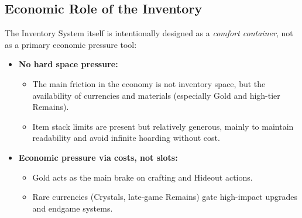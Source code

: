 \subsection{Economic Role of the Inventory}

The Inventory System itself is intentionally designed as a \emph{comfort container}, not as a primary economic pressure tool:

\begin{itemize}
	\item \textbf{No hard space pressure:}
	\begin{itemize}
		\item The main friction in the economy is not inventory space, but the availability of currencies and materials (especially Gold and high-tier Remains).
		\item Item stack limits are present but relatively generous, mainly to maintain readability and avoid infinite hoarding without cost.
	\end{itemize}
	\item \textbf{Economic pressure via costs, not slots:}
	\begin{itemize}
		\item Gold acts as the main brake on crafting and Hideout actions.
		\item Rare currencies (Crystals, late-game Remains) gate high-impact upgrades and endgame systems.
	\end{itemize}
\end{itemize}

